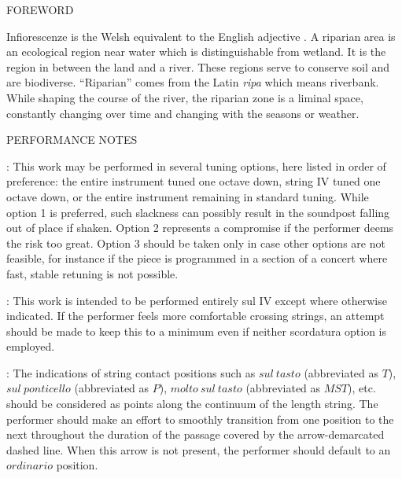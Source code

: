 \documentclass[11pt]{article}
\newcommand*\circled[1]{\tikz[baseline=(char.base)]{
            \node[shape=circle,draw,inner sep=1pt] (char) {#1};}}
\begin{document}
\begin{center}
\huge FOREWORD
\end{center}

\begingroup

\begin{center}
Infiorescenze is the Welsh equivalent to the English adjective . A riparian area is an ecological region near water which is distinguishable from wetland. It is the region in between the land and a river. These regions serve to conserve soil and are biodiverse. ``Riparian'' comes from the Latin \textit{ripa} which means riverbank. While shaping the course of the river, the riparian zone is a liminal space, constantly changing over time and changing with the seasons or weather.
\rightskip\leftskip
\phantom{text} \hfill \phantom{()}
\end{center}

\endgroup

\vspace*{9\baselineskip}

\begin{center}
\huge PERFORMANCE NOTES
\end{center}

 : This work may be performed in several tuning options, here listed in order of preference: \circled{1} the entire instrument tuned one octave down, \circled{2} string IV tuned one octave down, or \circled{3} the entire instrument remaining in standard tuning. While option 1 is preferred, such slackness can possibly result in the soundpost falling out of place if shaken. Option 2 represents a compromise if the performer deems the risk too great. Option 3 should be taken only in case other options are not feasible, for instance if the piece is programmed in a section of a concert where fast, stable retuning is not possible.
\rightskip\leftskip
\phantom{text} \hfill \phantom{()}

 : This work is intended to be performed entirely sul IV except where otherwise indicated. If the performer feels more comfortable crossing strings, an attempt should be made to keep this to a minimum even if neither scordatura option is employed.
\rightskip\leftskip
\phantom{text} \hfill \phantom{()}

 : The indications of string contact positions such as $sul \ tasto$ (abbreviated as $T$), $sul \ ponticello$ (abbreviated as $P$), $molto \ sul \ tasto$ (abbreviated as $MST$), etc. should be considered as points along the continuum of the length string. The performer should make an effort to smoothly transition from one position to the next throughout the duration of the passage covered by the arrow-demarcated dashed line. When this arrow is not present, the performer should default to an $ordinario$ position.
\rightskip\leftskip
\phantom{text} \hfill \phantom{()}
\end{document}
